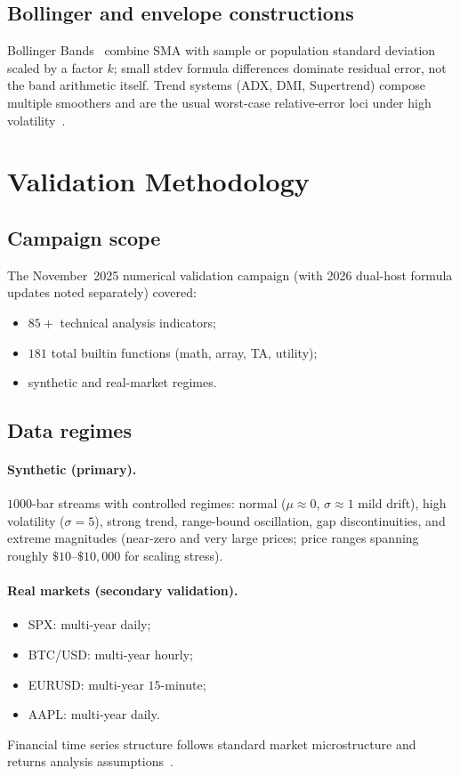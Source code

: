 \documentclass[11pt,a4paper]{article}
\begin{document}
\subsection{Bollinger and envelope constructions}
Bollinger Bands~\citep{bollinger2001} combine SMA with sample or population
standard deviation scaled by a factor $k$; small stdev formula differences
dominate residual error, not the band arithmetic itself.
Trend systems (ADX, DMI, Supertrend) compose multiple smoothers and are the
usual worst-case relative-error loci under high volatility~\citep{murphy1999technical}.

\section{Validation Methodology}
\label{sec:method}

\subsection{Campaign scope}
The November~2025 numerical validation campaign (with 2026 dual-host formula
updates noted separately) covered:
\begin{itemize}[leftmargin=*]
  \item $85+$ technical analysis indicators;
  \item $181$ total builtin functions (math, array, TA, utility);
  \item synthetic and real-market \ohlcv{} regimes.
\end{itemize}

\subsection{Data regimes}
\paragraph{Synthetic (primary).}
$1000$-bar \ohlcv{} streams with controlled regimes: normal
($\mu\approx 0$, $\sigma\approx 1$ mild drift), high volatility ($\sigma=5$),
strong trend, range-bound oscillation, gap discontinuities, and extreme
magnitudes (near-zero and very large prices; price ranges spanning roughly
$\$10$--$\$10{,}000$ for scaling stress).

\paragraph{Real markets (secondary validation).}
\begin{itemize}[leftmargin=*]
  \item SPX: multi-year daily;
  \item BTC/USD: multi-year hourly;
  \item EURUSD: multi-year $15$-minute;
  \item AAPL: multi-year daily.
\end{itemize}
Financial time series structure follows standard market microstructure and
returns analysis assumptions~\citep{tsay2010analysis,box1970time}.
\end{document}
